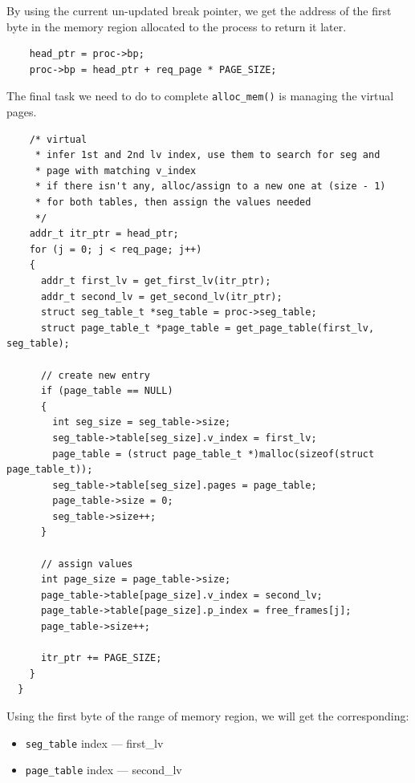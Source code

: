 \documentclass[a4paper]{article}
\numberwithin{equation}{section}
\begin{document}
By using the current un-updated break pointer, we get the address of the first byte in the memory region allocated to the process to return it later.

\begin{mdframed}[leftline=false,rightline=false,backgroundcolor=magenta!10,nobreak=false]
  \begin{verbatim}
    head_ptr = proc->bp;
    proc->bp = head_ptr + req_page * PAGE_SIZE;
  \end{verbatim}
\end{mdframed}

The final task we need to do to complete \texttt{alloc_mem()} is managing the virtual pages.
\begin{mdframed}[leftline=false,rightline=false,backgroundcolor=magenta!10,nobreak=false]
  \begin{verbatim}
    /* virtual
     * infer 1st and 2nd lv index, use them to search for seg and
     * page with matching v_index
     * if there isn't any, alloc/assign to a new one at (size - 1)
     * for both tables, then assign the values needed
     */
    addr_t itr_ptr = head_ptr;
    for (j = 0; j < req_page; j++)
    {
      addr_t first_lv = get_first_lv(itr_ptr);
      addr_t second_lv = get_second_lv(itr_ptr);
      struct seg_table_t *seg_table = proc->seg_table;
      struct page_table_t *page_table = get_page_table(first_lv, seg_table);

      // create new entry
      if (page_table == NULL)
      {
        int seg_size = seg_table->size;
        seg_table->table[seg_size].v_index = first_lv;
        page_table = (struct page_table_t *)malloc(sizeof(struct page_table_t));
        seg_table->table[seg_size].pages = page_table;
        page_table->size = 0;
        seg_table->size++;
      }

      // assign values
      int page_size = page_table->size;
      page_table->table[page_size].v_index = second_lv;
      page_table->table[page_size].p_index = free_frames[j];
      page_table->size++;

      itr_ptr += PAGE_SIZE;
    }
  }
  \end{verbatim}
\end{mdframed}

Using the first byte of the range of memory region, we will get the corresponding: %
\begin{itemize}
  \item \texttt{seg_table} index --- first\_lv
  \item \texttt{page_table} index --- second\_lv
\end{itemize}
\end{document}
